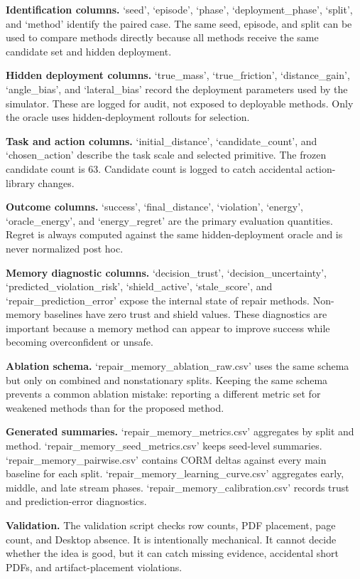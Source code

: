 \documentclass{article}
\begin{document}
\textbf{Identification columns.} `seed', `episode', `phase', `deployment\_phase', `split', and `method' identify the paired case. The same seed, episode, and split can be used to compare methods directly because all methods receive the same candidate set and hidden deployment.

\textbf{Hidden deployment columns.} `true\_mass', `true\_friction', `distance\_gain', `angle\_bias', and `lateral\_bias' record the deployment parameters used by the simulator. These are logged for audit, not exposed to deployable methods. Only the oracle uses hidden-deployment rollouts for selection.

\textbf{Task and action columns.} `initial\_distance', `candidate\_count', and `chosen\_action' describe the task scale and selected primitive. The frozen candidate count is 63. Candidate count is logged to catch accidental action-library changes.

\textbf{Outcome columns.} `success', `final\_distance', `violation', `energy', `oracle\_energy', and `energy\_regret' are the primary evaluation quantities. Regret is always computed against the same hidden-deployment oracle and is never normalized post hoc.

\textbf{Memory diagnostic columns.} `decision\_trust', `decision\_uncertainty', `predicted\_violation\_risk', `shield\_active', `stale\_score', and `repair\_prediction\_error' expose the internal state of repair methods. Non-memory baselines have zero trust and shield values. These diagnostics are important because a memory method can appear to improve success while becoming overconfident or unsafe.

\textbf{Ablation schema.} `repair\_memory\_ablation\_raw.csv' uses the same schema but only on combined and nonstationary splits. Keeping the same schema prevents a common ablation mistake: reporting a different metric set for weakened methods than for the proposed method.

\textbf{Generated summaries.} `repair\_memory\_metrics.csv' aggregates by split and method. `repair\_memory\_seed\_metrics.csv' keeps seed-level summaries. `repair\_memory\_pairwise.csv' contains CORM deltas against every main baseline for each split. `repair\_memory\_learning\_curve.csv' aggregates early, middle, and late stream phases. `repair\_memory\_calibration.csv' records trust and prediction-error diagnostics.

\textbf{Validation.} The validation script checks row counts, PDF placement, page count, and Desktop absence. It is intentionally mechanical. It cannot decide whether the idea is good, but it can catch missing evidence, accidental short PDFs, and artifact-placement violations.
\end{document}
